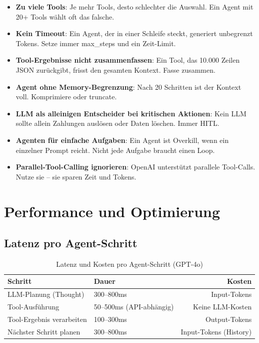 \begin{itemize}[leftmargin=*]
    \item \textbf{Zu viele Tools}: Je mehr Tools, desto schlechter die Auswahl. Ein Agent mit 20+ Tools wählt oft das falsche.
    \item \textbf{Kein Timeout}: Ein Agent, der in einer Schleife steckt, generiert unbegrenzt Tokens. Setze immer max\_steps und ein Zeit-Limit.
    \item \textbf{Tool-Ergebnisse nicht zusammenfassen}: Ein Tool, das 10.000 Zeilen JSON zurückgibt, frisst den gesamten Kontext. Fasse zusammen.
    \item \textbf{Agent ohne Memory-Begrenzung}: Nach 20 Schritten ist der Kontext voll. Komprimiere oder truncate.
    \item \textbf{LLM als alleinigen Entscheider bei kritischen Aktionen}: Kein LLM sollte allein Zahlungen auslösen oder Daten löschen. Immer HITL.
    \item \textbf{Agenten für einfache Aufgaben}: Ein Agent ist Overkill, wenn ein einzelner Prompt reicht. Nicht jede Aufgabe braucht einen Loop.
    \item \textbf{Parallel-Tool-Calling ignorieren}: OpenAI unterstützt parallele Tool-Calls. Nutze sie -- sie sparen Zeit und Tokens.
\end{itemize}

\section{Performance und Optimierung}

\subsection{Latenz pro Agent-Schritt}

\begin{table}[H]
\centering
\begin{tabularx}{\linewidth}{lXr}
\toprule
\textbf{Schritt} & \textbf{Dauer} & \textbf{Kosten} \\
\midrule
LLM-Planung (Thought) & 300--800ms & Input-Tokens \\
Tool-Ausführung & 50--500ms (API-abhängig) & Keine LLM-Kosten \\
Tool-Ergebnis verarbeiten & 100--300ms & Output-Tokens \\
Nächster Schritt planen & 300--800ms & Input-Tokens (History) \\
\midrule
\end{tabularx}
\caption{Latenz und Kosten pro Agent-Schritt (GPT-4o)}
\label{tab:agent-latency}
\end{table}

